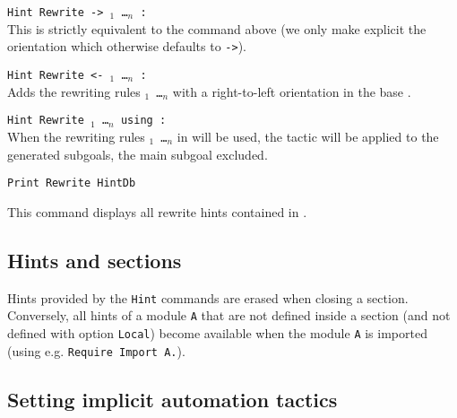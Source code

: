 \begin{Variants}
\item {\tt Hint Rewrite -> \term$_1$ \dots \term$_n$ : \ident}\\
This is strictly equivalent to the command above (we only make explicit the
orientation which otherwise defaults to {\tt ->}).

\item {\tt Hint Rewrite <- \term$_1$ \dots \term$_n$ : \ident}\\
Adds the rewriting rules {\tt \term$_1$ \dots \term$_n$} with a right-to-left
orientation in the base {\tt \ident}.

\item {\tt Hint Rewrite \term$_1$ \dots \term$_n$ using {\tac} : {\ident}}\\
When the rewriting rules {\tt \term$_1$ \dots \term$_n$} in {\tt \ident} will
be used, the tactic {\tt \tac} will be applied to the generated subgoals, the
main subgoal excluded.


\item \texttt{Print Rewrite HintDb {\ident}}

  This command displays all rewrite hints contained in {\ident}.

\end{Variants}

\subsection{Hints and sections
\label{Hint-and-Section}}

Hints provided by the \texttt{Hint} commands are erased when closing a
section. Conversely, all hints of a module \texttt{A} that are not
defined inside a section (and not defined with option {\tt Local}) become
available when the module {\tt A} is imported (using
e.g. \texttt{Require Import A.}).

\subsection{Setting implicit automation tactics}

